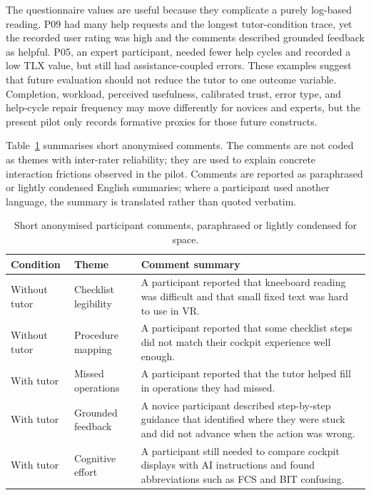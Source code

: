 The questionnaire values are useful because they complicate a purely log-based
reading. P09 had many help requests and the longest tutor-condition trace, yet
the recorded user rating was high and the comments described grounded feedback
as helpful. P05, an expert participant, needed fewer help cycles and recorded a
low TLX value, but still had assistance-coupled errors. These examples suggest
that future evaluation should not reduce the tutor to one outcome variable.
Completion, workload, perceived usefulness, calibrated trust, error type, and
help-cycle repair frequency may move differently for novices and experts, but
the present pilot only records formative proxies for those future constructs.

Table~\ref{tab:pilot-comments} summarises short anonymised comments. The
comments are not coded as themes with inter-rater reliability; they are used to
explain concrete interaction frictions observed in the pilot. Comments are
reported as paraphrased or lightly condensed English summaries; where a
participant used another language, the summary is translated rather than quoted
verbatim.

\begin{table}[htbp]
\centering
\caption{Short anonymised participant comments, paraphrased or lightly
condensed for space.}
\label{tab:pilot-comments}
\small
\begin{tabularx}{\textwidth}{@{}llX@{}}
\toprule
\textbf{Condition} & \textbf{Theme} & \textbf{Comment summary} \\
\midrule
Without tutor & Checklist legibility & A participant reported that kneeboard reading was difficult and that small fixed text was hard to use in VR. \\
Without tutor & Procedure mapping & A participant reported that some checklist steps did not match their cockpit experience well enough. \\
With tutor & Missed operations & A participant reported that the tutor helped fill in operations they had missed. \\
With tutor & Grounded feedback & A novice participant described step-by-step guidance that identified where they were stuck and did not advance when the action was wrong. \\
With tutor & Cognitive effort & A participant still needed to compare cockpit displays with AI instructions and found abbreviations such as FCS and BIT confusing. \\
\bottomrule
\end{tabularx}
\end{table}

